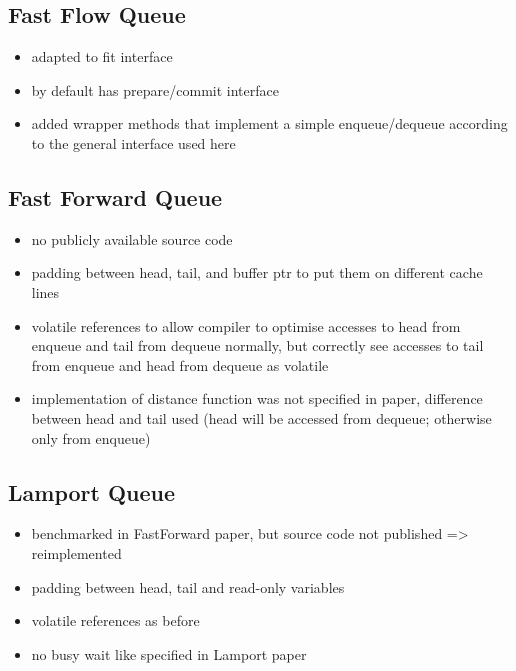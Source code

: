 \subsection{Fast Flow Queue}
\begin{itemize}
    \item adapted to fit interface
    \item by default has prepare/commit interface
    \item added wrapper methods that implement a simple enqueue/dequeue according to the general interface used here
\end{itemize}

\subsection{Fast Forward Queue}
\begin{itemize}
    \item no publicly available source code
    \item padding between head, tail, and buffer ptr to put them on different cache lines
    \item volatile references to allow compiler to optimise accesses to head from enqueue and tail from
        dequeue normally, but correctly see accesses to tail from enqueue and head from dequeue as volatile
    \item implementation of distance function was not specified in paper, difference between head and tail
        used (head will be accessed from dequeue; otherwise only from enqueue)
\end{itemize}

\subsection{Lamport Queue}
\begin{itemize}
    \item benchmarked in FastForward paper, but source code not published => reimplemented
    \item padding between head, tail and read-only variables
    \item volatile references as before
    \item no busy wait like specified in Lamport paper
\end{itemize}
